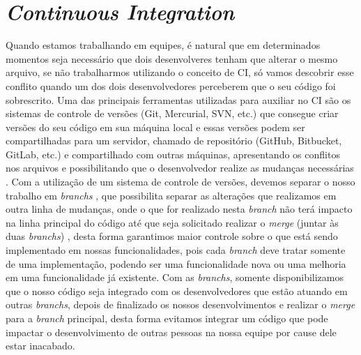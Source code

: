       \section{\textit{Continuous Integration}}
        Quando estamos trabalhando em equipes, é natural que em determinados momentos
        seja necessário que dois desenvolveres tenham que alterar o mesmo arquivo,
        se não trabalharmos utilizando o conceito de CI, só vamos descobrir esse
        conflito quando um dos dois desenvolvedores perceberem que o seu código
        foi sobrescrito. Uma das principais ferramentas utilizadas para auxiliar
        no CI são os sistemas de controle de versões (Git, Mercurial, SVN, etc.)
        que consegue criar versões do seu código em sua máquina local e essas versões
        podem ser compartilhadas para um servidor, chamado de repositório (GitHub,
        Bitbucket, GitLab, etc.) e compartilhado com outras máquinas, apresentando
        os conflitos nos arquivos e possibilitando que o desenvolvedor realize as
        mudanças necessárias \cite{ProGit}. \newline
        Com a utilização de um sistema de controle de versões, devemos separar o
        nosso trabalho em \textit{branchs} \cite{TheDevOpsHandbook}, que possibilita
        separar as alterações que realizamos em outra linha de mudanças, onde
        o que for realizado nesta \textit{branch} não terá impacto na linha
        principal do código até que seja solicitado realizar o \textit{merge}
        (juntar às duas \textit{branchs}) \cite{ProGit}, desta forma garantimos maior
        controle sobre o que está sendo implementado em nossas funcionalidades, pois
        cada \textit{branch} deve tratar somente de uma implementação, podendo ser
        uma funcionalidade nova ou uma melhoria em uma funcionalidade já existente.
        Com as \textit{branchs}, somente disponibilizamos que o nosso código seja
        integrado com os desenvolvedores que estão atuando em outras \textit{branchs},
        depois de finalizado os nossos desenvolvimentos e realizar o \textit{merge}
        para a \textit{branch} principal, desta forma evitamos integrar um código
        que pode impactar o desenvolvimento de outras pessoas na nossa equipe por
        cause dele estar inacabado. \newline

